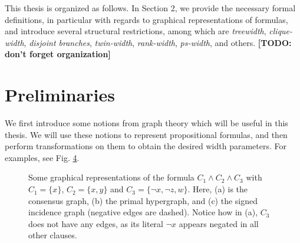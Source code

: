 \documentclass{article}
\begin{document}
This thesis is organized as follows.
In Section 2, we provide the necessary formal definitions, in particular with regards to graphical representations of formulas, and introduce several structural restrictions, among which are {\em treewidth}, {\em clique-width}, {\em disjoint branches}, {\em twin-width}, {\em rank-width}, {\em ps-width}, and others.
\textbf{[TODO: don't forget organization]}

\section{Preliminaries}

We first introduce some notions from graph theory which will be useful in this thesis.
We will use these notions to represent propositional formulas, and then perform transformations on them to obtain the desired width parameters.
For examples, see Fig. \ref{fig:graphs}.\\

\begin{figure}
	\centering
	\begin{subfigure}[b]{0.22\textwidth}
		
		\caption{}
		\label{fig:consensus}
	\end{subfigure}
	\begin{subfigure}[b]{0.38\textwidth}
		
		\caption{}
		\label{fig:hypergraph}
	\end{subfigure}
	\begin{subfigure}[b]{0.3\textwidth}
		
		\caption{}
		\label{fig:trigraph}
	\end{subfigure}
	\caption{
		Some graphical representations of the formula $C_1 \land C_2 \land C_3$ with $C_1 = \{x\}$, $C_2 = \{x,y\}$ and $C_3=\{\neg x, \neg z, w\}$.
		Here, (a) is the consensus graph, (b) the primal hypergraph, and (c) the signed incidence graph (negative edges are dashed).
		Notice how in (a), $C_3$ does not have any edges, as its literal $\neg x$ appears negated in all other clauses.
	}
	\label{fig:graphs}
\end{figure}
\end{document}
